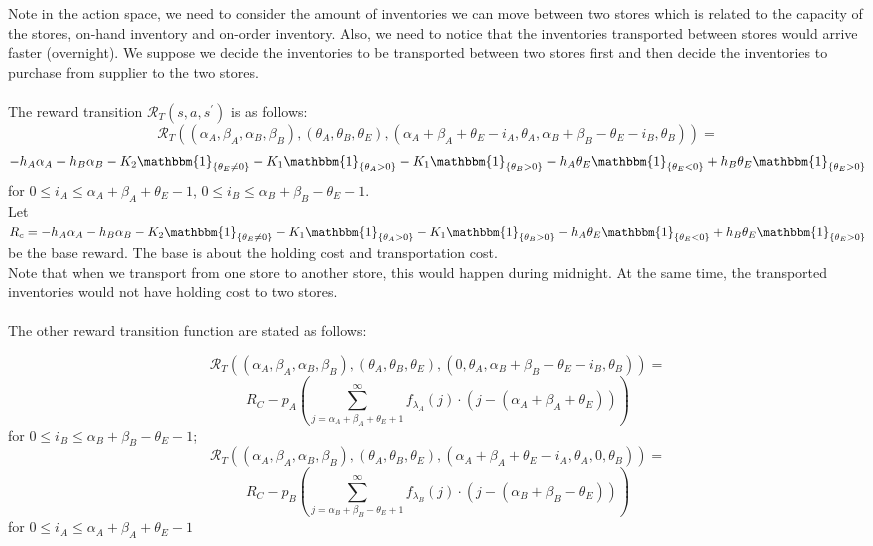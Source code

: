 \documentclass{article}
\begin{document}
Note in the action space, we need to consider the amount of inventories we can move between two stores which is related to the capacity of the stores, on-hand inventory and on-order inventory. Also, we need to notice that the inventories transported between stores would arrive faster (overnight). We suppose we decide the inventories to be transported between two stores first and then decide the inventories to purchase from supplier to the two stores.\\ \\
The reward transition $\mathcal{R}_{T}(s, a, s^{\prime})$ is as follows:
$$\mathcal{R}_{T}((\alpha_{A}, \beta_{A}, \alpha_{B}, \beta_{B}), (\theta_{A}, \theta_{B}, \theta_{E}),(\alpha_{A}+\beta_{A}+\theta_{E}-i_{A}, \theta_{A},\alpha_{B}+\beta_{B}-\theta_{E}-i_{B}, \theta_{B} ))=$$
$$-h_{A}\alpha_{A}-h_{B}\alpha_{B}-K_{2}\mathbbm{1}_{\{\theta_{E} \neq 0\}}-K_{1}\mathbbm{1}_{\{\theta_{A} >0\}}-K_{1}\mathbbm{1}_{\{\theta_{B} >0\}}-h_{A}\theta_{E}\mathbbm{1}_{\{\theta_{E} <0\}}+h_{B}\theta_{E}\mathbbm{1}_{\{\theta_{E}>0\}}$$ for $ 0 \leq i_{A} \leq \alpha_{A}+\beta_{A}+\theta_{E}-1$, $ 0 \leq i_{B} \leq \alpha_{B}+\beta_{B}-\theta_{E}-1$.\\
Let $R_{c}=-h_{A}\alpha_{A}-h_{B}\alpha_{B}-K_{2}\mathbbm{1}_{\{\theta_{E} \neq 0 \}}-K_{1}\mathbbm{1}_{\{\theta_{A} >0\}}-K_{1}\mathbbm{1}_{\{\theta_{B} >0\}}-h_{A}\theta_{E}\mathbbm{1}_{\{\theta_{E} <0\}}+h_{B}\theta_{E}\mathbbm{1}_{\{\theta_{E}>0\}}$ be the base reward. The base is about the holding cost and transportation cost.\\
Note that when we transport from one store to another store, this would happen during midnight. At the same time, the transported inventories would not have holding cost to two stores.\\ \\
The other reward transition function are stated as follows:

$$\mathcal{R}_{T}((\alpha_{A}, \beta_{A}, \alpha_{B}, \beta_{B}), (\theta_{A}, \theta_{B}, \theta_{E}),(0, \theta_{A},\alpha_{B}+\beta_{B}-\theta_{E}-i_{B}, \theta_{B} ))=$$
$$R_{C}-p_{A}(\sum_{j=\alpha_{A}+\beta_{A}+\theta_{E}+1}^{\infty} f_{\lambda_{A}}(j) \cdot(j-(\alpha_{A}+\beta_{A}+\theta_{E})))$$ for $ 0 \leq i_{B} \leq \alpha_{B}+\beta_{B}-\theta_{E}-1$;\\

$$\mathcal{R}_{T}((\alpha_{A}, \beta_{A}, \alpha_{B}, \beta_{B}), (\theta_{A}, \theta_{B}, \theta_{E}),(\alpha_{A}+\beta_{A}+\theta_{E}-i_{A}, \theta_{A},0, \theta_{B} ))=$$
$$R_{C} -p_{B}(\sum_{j=\alpha_{B}+\beta_{B}-\theta_{E}+1}^{\infty} f_{\lambda_{B}}(j) \cdot(j-(\alpha_{B}+\beta_{B}-\theta_{E})))$$ for $ 0 \leq i_{A} \leq \alpha_{A}+\beta_{A}+\theta_{E}-1$\\
\end{document}
